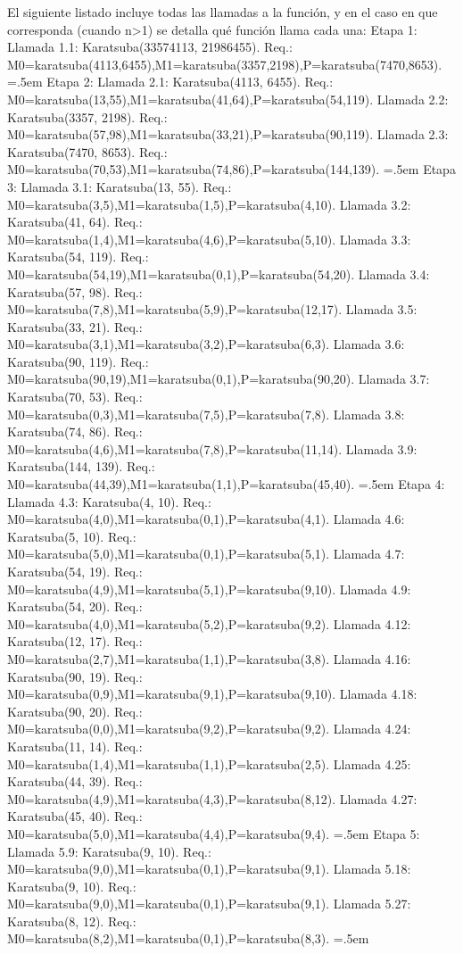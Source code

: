 \documentclass[titlepage,a4paper]{article}
\newenvironment{lcverbatim}
 {\SaveVerbatim{cverb}}
 {\endSaveVerbatim
  \flushleft\fboxrule=0pt\fboxsep=.5em
  \colorbox{cverbbg}{%
    \makebox[\dimexpr\linewidth-2\fboxsep][l]{\BUseVerbatim{cverb}}%
  }
  \endflushleft
}
\begin{document}
\newpage El siguiente listado incluye todas las llamadas a la función, y en el caso en que corresponda (cuando n>1) se detalla qué función llama cada una:
\begin{lcverbatim}
Etapa 1:
	Llamada 1.1: Karatsuba(33574113, 21986455). Req.:
		M0=karatsuba(4113,6455),M1=karatsuba(3357,2198),P=karatsuba(7470,8653).
\end{lcverbatim}
\begin{lcverbatim}
Etapa 2:
	Llamada 2.1: Karatsuba(4113, 6455). Req.:
		M0=karatsuba(13,55),M1=karatsuba(41,64),P=karatsuba(54,119).
	Llamada 2.2: Karatsuba(3357, 2198). Req.:
		M0=karatsuba(57,98),M1=karatsuba(33,21),P=karatsuba(90,119).
	Llamada 2.3: Karatsuba(7470, 8653). Req.:
		M0=karatsuba(70,53),M1=karatsuba(74,86),P=karatsuba(144,139).
\end{lcverbatim}
\begin{lcverbatim}
Etapa 3:
	Llamada 3.1: Karatsuba(13, 55). Req.:
		M0=karatsuba(3,5),M1=karatsuba(1,5),P=karatsuba(4,10).
	Llamada 3.2: Karatsuba(41, 64). Req.:
		M0=karatsuba(1,4),M1=karatsuba(4,6),P=karatsuba(5,10).
	Llamada 3.3: Karatsuba(54, 119). Req.:
		M0=karatsuba(54,19),M1=karatsuba(0,1),P=karatsuba(54,20).
	Llamada 3.4: Karatsuba(57, 98). Req.:
		M0=karatsuba(7,8),M1=karatsuba(5,9),P=karatsuba(12,17).
	Llamada 3.5: Karatsuba(33, 21). Req.:
		M0=karatsuba(3,1),M1=karatsuba(3,2),P=karatsuba(6,3).
	Llamada 3.6: Karatsuba(90, 119). Req.:
		M0=karatsuba(90,19),M1=karatsuba(0,1),P=karatsuba(90,20).
	Llamada 3.7: Karatsuba(70, 53). Req.:
		M0=karatsuba(0,3),M1=karatsuba(7,5),P=karatsuba(7,8).
	Llamada 3.8: Karatsuba(74, 86). Req.:
		M0=karatsuba(4,6),M1=karatsuba(7,8),P=karatsuba(11,14).
	Llamada 3.9: Karatsuba(144, 139). Req.:
		M0=karatsuba(44,39),M1=karatsuba(1,1),P=karatsuba(45,40).
\end{lcverbatim}
\begin{lcverbatim}
Etapa 4:
	Llamada 4.3: Karatsuba(4, 10). Req.:
		M0=karatsuba(4,0),M1=karatsuba(0,1),P=karatsuba(4,1).
	Llamada 4.6: Karatsuba(5, 10). Req.:
		M0=karatsuba(5,0),M1=karatsuba(0,1),P=karatsuba(5,1).
	Llamada 4.7: Karatsuba(54, 19). Req.:
		M0=karatsuba(4,9),M1=karatsuba(5,1),P=karatsuba(9,10).
	Llamada 4.9: Karatsuba(54, 20). Req.:
		M0=karatsuba(4,0),M1=karatsuba(5,2),P=karatsuba(9,2).
	Llamada 4.12: Karatsuba(12, 17). Req.:
		M0=karatsuba(2,7),M1=karatsuba(1,1),P=karatsuba(3,8).
	Llamada 4.16: Karatsuba(90, 19). Req.:
		M0=karatsuba(0,9),M1=karatsuba(9,1),P=karatsuba(9,10).
	Llamada 4.18: Karatsuba(90, 20). Req.:
		M0=karatsuba(0,0),M1=karatsuba(9,2),P=karatsuba(9,2).
	Llamada 4.24: Karatsuba(11, 14). Req.:
		M0=karatsuba(1,4),M1=karatsuba(1,1),P=karatsuba(2,5).
	Llamada 4.25: Karatsuba(44, 39). Req.:
		M0=karatsuba(4,9),M1=karatsuba(4,3),P=karatsuba(8,12).
	Llamada 4.27: Karatsuba(45, 40). Req.:
		M0=karatsuba(5,0),M1=karatsuba(4,4),P=karatsuba(9,4).
\end{lcverbatim}
\begin{lcverbatim}
Etapa 5:
	Llamada 5.9: Karatsuba(9, 10). Req.:
		M0=karatsuba(9,0),M1=karatsuba(0,1),P=karatsuba(9,1).
	Llamada 5.18: Karatsuba(9, 10). Req.:
		M0=karatsuba(9,0),M1=karatsuba(0,1),P=karatsuba(9,1).
	Llamada 5.27: Karatsuba(8, 12). Req.:
		M0=karatsuba(8,2),M1=karatsuba(0,1),P=karatsuba(8,3).
\end{lcverbatim}
\end{document}
